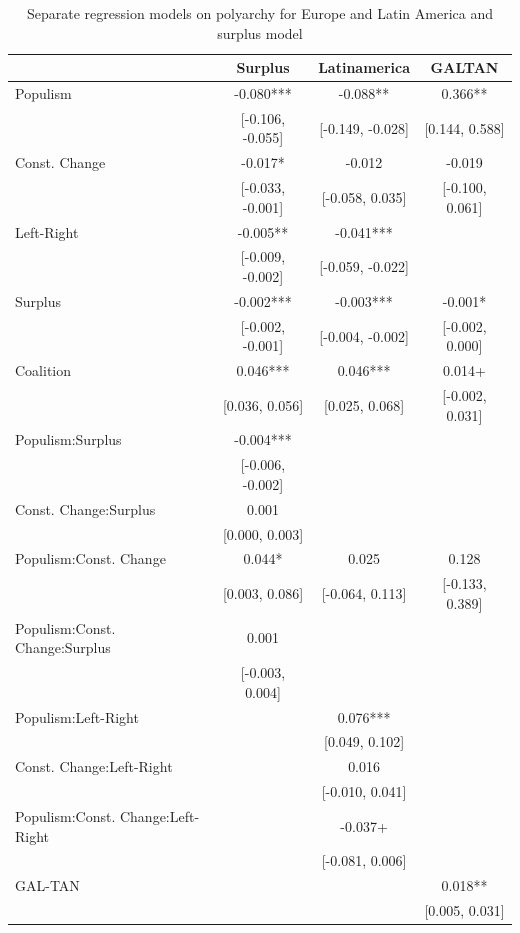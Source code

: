 \documentclass[
  abstract]{article}
\begin{document}
\hypertarget{tbl-polyarchy_sep}{}
\begin{table}
\caption{\label{tbl-polyarchy_sep}Separate regression models on polyarchy for Europe and Latin America and
surplus model }\tabularnewline

\centering\centering\centering
\begin{tabular}[t]{lccc}
\toprule
  & Surplus & Latinamerica & GALTAN\\
\midrule
Populism & -0.080*** & -0.088** & 0.366**\\
 & {}[-0.106, -0.055] & {}[-0.149, -0.028] & {}[0.144, 0.588]\\
Const. Change & -0.017* & -0.012 & -0.019\\
 & {}[-0.033, -0.001] & {}[-0.058, 0.035] & {}[-0.100, 0.061]\\
Left-Right & -0.005** & -0.041*** & \\
 & {}[-0.009, -0.002] & {}[-0.059, -0.022] & \\
Surplus & -0.002*** & -0.003*** & -0.001*\\
 & {}[-0.002, -0.001] & {}[-0.004, -0.002] & {}[-0.002, 0.000]\\
Coalition & 0.046*** & 0.046*** & 0.014+\\
 & {}[0.036, 0.056] & {}[0.025, 0.068] & {}[-0.002, 0.031]\\
Populism:Surplus & -0.004*** &  & \\
 & {}[-0.006, -0.002] &  & \\
Const. Change:Surplus & 0.001 &  & \\
 & {}[0.000, 0.003] &  & \\
Populism:Const. Change & 0.044* & 0.025 & 0.128\\
 & {}[0.003, 0.086] & {}[-0.064, 0.113] & {}[-0.133, 0.389]\\
Populism:Const. Change:Surplus & 0.001 &  & \\
 & {}[-0.003, 0.004] &  & \\
Populism:Left-Right &  & 0.076*** & \\
 &  & {}[0.049, 0.102] & \\
Const. Change:Left-Right &  & 0.016 & \\
 &  & {}[-0.010, 0.041] & \\
Populism:Const. Change:Left-Right &  & -0.037+ & \\
 &  & {}[-0.081, 0.006] & \\
GAL-TAN &  &  & 0.018**\\
 &  &  & {}[0.005, 0.031]\\

\end{tabular}
\end{table}
\end{document}
